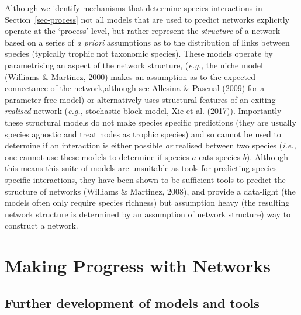 \documentclass[
]{article}
\begin{document}
Although we identify mechanisms that determine species interactions in
Section~\ref{sec-process} not all models that are used to predict
networks explicitly operate at the `process' level, but rather represent
the \emph{structure} of a network based on a series of \emph{a priori}
assumptions as to the distribution of links between species (typically
trophic not taxonomic species). These models operate by parametrising an
aspect of the network structure, (\emph{e.g.,} the niche model (Williams
\& Martinez, 2000) makes an assumption as to the expected connectance of
the network,although see Allesina \& Pascual (2009) for a parameter-free
model) or alternatively uses structural features of an exiting
\emph{realised} network (\emph{e.g.,} stochastic block model, Xie et al.
(2017)). Importantly these structural models do not make species
specific predictions (they are usually species agnostic and treat nodes
as trophic species) and so cannot be used to determine if an interaction
is either possible \emph{or} realised between two species (\emph{i.e.,}
one cannot use these models to determine if species \(a\) eats species
\(b\)). Although this means this suite of models are unsuitable as tools
for predicting species-specific interactions, they have been shown to be
sufficient tools to predict the structure of networks (Williams \&
Martinez, 2008), and provide a data-light (the models often only require
species richness) but assumption heavy (the resulting network structure
is determined by an assumption of network structure) way to construct a
network.

\section{Making Progress with
Networks}\label{making-progress-with-networks}

\subsection{Further development of models and
tools}\label{further-development-of-models-and-tools}
\end{document}
